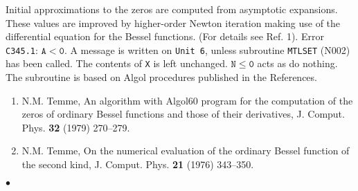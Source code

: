 \Method
Initial approximations to the zeros are computed from asymptotic
expansions. These values are improved by higher-order Newton iteration
making use of the differential equation for the Bessel functions. (For
details see Ref. 1).
\Errorh
Error {\tt C345.1}: $\mathtt{A<0}.$
A message is written on {\tt Unit 6}, unless subroutine {\tt MTLSET}
(N002) has been called. The contents of {\tt X} is left unchanged.
$\mathtt{N \le 0}$ acts as do nothing.
\newpage
\Source
The subroutine is based on Algol procedures published in the References.
\Refer
\begin{enumerate}
\item N.M. Temme, An algorithm with Algol60 program for the computation
of the zeros of ordinary Bessel functions and those of their
derivatives, J. Comput. Phys. {\bf 32} (1979) 270--279.
\item N.M. Temme, On the numerical evaluation of the ordinary Bessel
function of the second kind, J. Comput. Phys. {\bf 21} (1976) 343--350.
\end{enumerate}
$\bullet$
